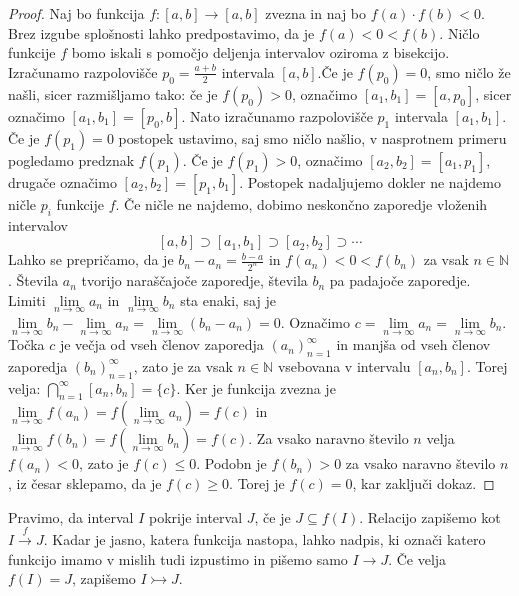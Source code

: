 \documentclass[mat2]{fmfdelo}
\newcommand{\N}{\mathbb N}
\begin{document}
\begin{proof}
Naj bo funkcija $f:[a, b] \to [a, b]$ zvezna in naj bo $f(a)\cdot f(b) < 0$. Brez izgube splošnosti lahko predpostavimo, da je $f(a) < 0 < f(b)$. Ničlo funkcije $f$ bomo iskali s pomočjo deljenja intervalov oziroma z bisekcijo. Izračunamo razpolovišče $p_0=\frac{a+b}{2}$ intervala $[a, b]$.Če je $f(p_0)=0$, smo ničlo že našli, sicer razmišljamo tako: če je $f(p_0) >0$, označimo $[a_1, b_1] =  [a, p_0]$, sicer označimo $[a_1, b_1] =  [p_0, b]$. Nato izračunamo razpolovišče $p_1$ intervala $[a_1, b_1]$. Če je $f(p_1)=0$ postopek ustavimo, saj smo ničlo našlio, v nasprotnem primeru pogledamo predznak $f(p_1)$. Če je $f(p_1) >0$, označimo $[a_2, b_2] =  [a_1, p_1]$, drugače označimo $[a_2, b_2] =  [p_1, b_1]$. Postopek nadaljujemo dokler ne najdemo ničle $p_i$ funkcije $f$. Če ničle ne najdemo, dobimo neskončno zaporedje vloženih intervalov 
$$ [a, b] \supset [a_1, b_1] \supset [a_2, b_2] \supset \cdots$$
Lahko se prepričamo, da je $b_n - a_n = \frac{b-a}{2^n}$ in $f(a_n)<0<f(b_n)$ za vsak $n\in \N$. Števila $a_n$ tvorijo naraščajoče zaporedje, števila $b_n$ pa padajoče zaporedje.  Limiti $\lim\limits_{n \to \infty} a_n$ in $\lim\limits_{n \to \infty} b_n$ sta enaki, saj je 
$\lim\limits_{n \to \infty} b_n - \lim\limits_{n \to \infty} a_n = \lim\limits_{n \to \infty} (b_n - a_n) =0$. Označimo $c = \lim\limits_{n \to \infty} a_n = \lim\limits_{n \to \infty} b_n$. Točka $c$ je večja od vseh členov zaporedja $\left(a_n \right)_{n=1}^{\infty}$ in manjša od vseh členov zaporedja $\left(b_n \right)_{n=1}^{\infty}$, zato je za vsak $n \in \N$ vsebovana v intervalu $[a_n, b_n]$. Torej velja:
$\bigcap\limits_{n=1}^{\infty} [a_n, b_n] = \{c\}$. 
Ker je funkcija zvezna je 
$\lim\limits_{n \to \infty} f(a_n) = f(\lim\limits_{n \to \infty} a_n) = f(c)$
in 
$\lim\limits_{n \to \infty} f(b_n) = f(\lim\limits_{n \to \infty} b_n) = f(c)$.
Za vsako naravno število $n$ velja $f(a_n) <0$, zato je $f(c) \leq 0$. Podobn je $f(b_n) > 0$ za vsako naravno število $n$, iz česar sklepamo, da je $f(c) \geq 0$. Torej je $f(c) = 0$, kar zaključi dokaz.
\end{proof}

\begin{definicija}\label{def:pokritja}
Pravimo, da interval $I$ pokrije interval $J$, če je $J \subseteq f(I)$. Relacijo zapišemo kot $I \xrightarrow{f} J$. Kadar je jasno, katera funkcija nastopa, lahko nadpis, ki označi katero funkcijo imamo v mislih tudi izpustimo in pišemo samo $I \to J$. Če velja $f(I) =J$, zapišemo $I \rightarrowtail J$.
\end{definicija}
\end{document}
